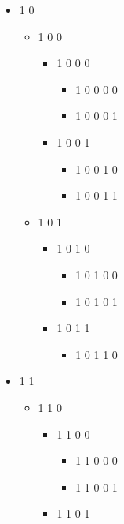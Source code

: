 \begin{itemize}
\item 1 0 


\begin{itemize}
\item 1 0 0 


\begin{itemize}
\item 1 0 0 0 


\begin{itemize}
\item 1 0 0 0 0 
\item 1 0 0 0 1
\end{itemize}
\item 1 0 0 1 


\begin{itemize}
\item 1 0 0 1 0 
\item 1 0 0 1 1
\end{itemize}
\end{itemize}
\item 1 0 1 


\begin{itemize}
\item 1 0 1 0 


\begin{itemize}
\item 1 0 1 0 0 
\item 1 0 1 0 1
\end{itemize}
\item 1 0 1 1 


\begin{itemize}
\item 1 0 1 1 0
\end{itemize}
\end{itemize}
\end{itemize}
\item 1 1 


\begin{itemize}
\item 1 1 0 


\begin{itemize}
\item 1 1 0 0 


\begin{itemize}
\item 1 1 0 0 0 
\item 1 1 0 0 1
\end{itemize}
\item 1 1 0 1 



\end{itemize}
\end{itemize}
\end{itemize}
